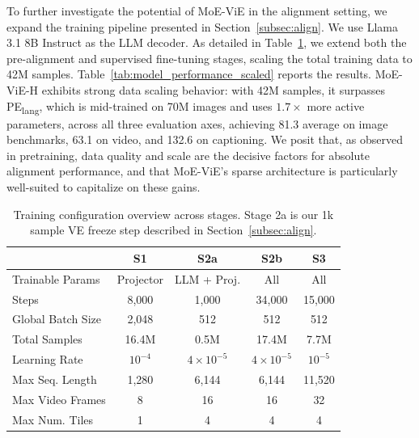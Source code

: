 \documentclass[runningheads]{llncs}
\begin{document}
To further investigate the potential of MoE-ViE in the alignment setting, we expand the training pipeline presented in Section~\ref{subsec:align}. We use Llama 3.1 8B Instruct \cite{llama3} as the LLM decoder. As detailed in Table~\ref{tab:training_stages}, we extend both the pre-alignment and supervised fine-tuning stages, scaling the total training data to 42M samples. Table~\ref{tab:model_performance_scaled} reports the results. MoE-ViE-H exhibits strong data scaling behavior: with 42M samples, it surpasses PE\textsubscript{lang}, which is mid-trained on 70M images and uses $1.7\times$ more active parameters, across all three evaluation axes, achieving 81.3 average on image benchmarks, 63.1 on video, and 132.6 on captioning. We posit that, as observed in pretraining, data quality and scale are the decisive factors for absolute alignment performance, and that MoE-ViE's sparse architecture is particularly well-suited to capitalize on these gains.

\begin{table}[htbp]
  \centering
  \caption{Training configuration overview across stages. Stage 2a is our 1k sample VE freeze step described in Section~\ref{subsec:align}.}
  \label{tab:training_stages}
  \fontsize{6.5}{8}\selectfont
  \setlength{\tabcolsep}{8pt} 
  \begin{tabular}{@{}lcccc@{}}
    \toprule
    & \textbf{S1} & \textbf{S2a} & \textbf{S2b} & \textbf{S3} \\
    \midrule
    Trainable Params & Projector & LLM + Proj. & All & All \\
    \midrule
    Steps            & 8,000  & 1,000  & 34,000 & 15,000 \\
    Global Batch Size& 2,048  & 512    & 512    & 512    \\
    Total Samples    & 16.4M  & 0.5M   & 17.4M  & 7.7M  \\
    Learning Rate    & $10^{-4}$ & $4{\times}10^{-5}$ & $4{\times}10^{-5}$ & $10^{-5}$ \\
    \midrule
    Max Seq. Length  & 1,280  & 6,144  & 6,144  & 11,520 \\
    Max Video Frames & 8      & 16     & 16     & 32     \\
    Max Num. Tiles   & 1      & 4      & 4      & 4      \\
    \bottomrule
  \end{tabular}
\end{table}
\end{document}
